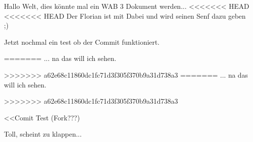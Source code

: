 \documentclass[a4paper,12pt]{scrreprt}
\begin{document}
Hallo Welt, dies könnte mal ein WAB 3 Dokument werden...
<<<<<<< HEAD
<<<<<<< HEAD
Der Florian ist mit Dabei und wird seinen Senf dazu geben ;)

Jetzt nochmal ein test ob der Commit funktioniert.

=======
... na das will ich sehen.

>>>>>>> a62e68c11860dc1fc71d3f305f370b9a31d738a3
=======
... na das will ich sehen.

>>>>>>> a62e68c11860dc1fc71d3f305f370b9a31d738a3

<<Comit Test (Fork???)

Toll, scheint zu klappen...
\end{document}
